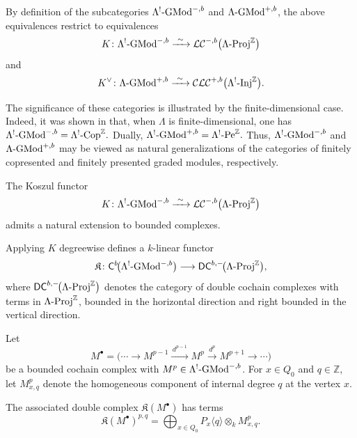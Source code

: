 \documentclass[11pt]{article}
\theoremstyle{definition}
\theoremstyle{remark}
\begin{document}
By definition of the subcategories
\(\Lambda^{!}\textup{-GMod}^{-,b}\)
and
\(\Lambda\textup{-GMod}^{+,b}\),
the above equivalences restrict to equivalences
\[
K \colon
\Lambda^{!}\textup{-GMod}^{-,b}
\xrightarrow{\ \sim\ }
\mathcal{LC}^{-,b}\bigl(\Lambda\textup{-Proj}^{\mathbb Z}\bigr)
\]
and
\[
K^{\vee} \colon
\Lambda\textup{-GMod}^{+,b}
\xrightarrow{\ \sim\ }
\mathcal{CLC}^{+,b}\bigl(\Lambda^{!}\textup{-Inj}^{\mathbb Z}\bigr).
\]

The significance of these categories is illustrated by the finite-dimensional case. Indeed, it was shown in \cite[Proposition~3.4]{8} that, when \(\Lambda\) is finite-dimensional, one has
\( 
\Lambda^{!}\textup{-GMod}^{-,b}
=
\Lambda^{!}\textup{-Cop}^{\mathbb Z}.
\)
Dually,
\( 
\Lambda^{!}\textup{-GMod}^{+,b}
=
\Lambda^{!}\textup{-Pe}^{\mathbb Z}.
\)
Thus,
\(\Lambda^{!}\textup{-GMod}^{-,b}\)
and
\(\Lambda\textup{-GMod}^{+,b}\)
may be viewed as natural generalizations of the categories of finitely copresented and finitely presented graded modules, respectively.

\medskip 

The Koszul functor
\[
K \colon
\Lambda^{!}\textup{-GMod}^{-,b}
\xrightarrow{\ \sim\ }
\mathcal{LC}^{-,b}\bigl(\Lambda\textup{-Proj}^{\mathbb Z}\bigr)
\]
admits a natural extension to bounded complexes.

Applying \(K\) degreewise defines a \(k\)-linear functor
\[
\mathfrak{K}\colon
\mathsf{C}^{b}\!\bigl(\Lambda^{!}\textup{-}\mathrm{GMod}^{-,b}\bigr)
\longrightarrow
\mathsf{DC}^{b,-}\!\bigl(\Lambda\textup{-}\mathrm{Proj}^{\mathbb Z}\bigr),
\]
where
\(\mathsf{DC}^{b,-}\!\bigl(\Lambda\textup{-}\mathrm{Proj}^{\mathbb Z}\bigr)\)
denotes the category of double cochain complexes with terms in
\(\Lambda\textup{-}\mathrm{Proj}^{\mathbb Z}\), bounded in the horizontal
direction and right bounded in the vertical direction.

Let
\[
M^\bullet=
\bigl(
\cdots \longrightarrow M^{p-1}
\xrightarrow{\,d^{p-1}\,}
M^{p}
\xrightarrow{\,d^{p}\,}
M^{p+1}
\longrightarrow \cdots
\bigr)
\]
be a bounded cochain complex with
\(M^{p}\in \Lambda^{!}\textup{-}\mathrm{GMod}^{-,b}\).
For \(x\in Q_0\) and \(q\in\mathbb Z\), let
\(M^p_{x,q}\) denote the homogeneous component of internal degree \(q\) at
the vertex \(x\).

The associated double complex \(\mathfrak K(M^\bullet)\) has terms
\[
\mathfrak K(M^\bullet)^{p,q}
=
\bigoplus_{x\in Q_0}
P_x\langle q\rangle\otimes_k M^p_{x,q}.
\]
\end{document}
